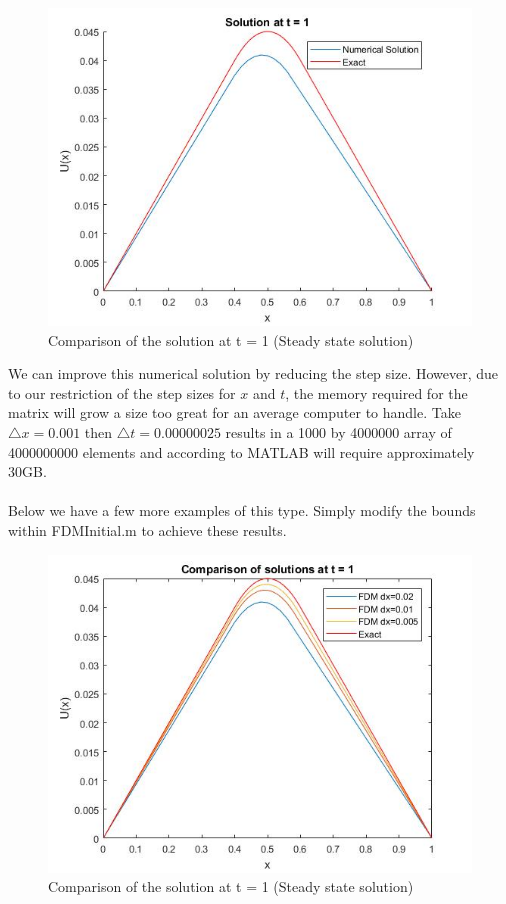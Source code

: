 \documentclass{article}
\begin{document}
\begin{figure}
	\begin{center}
		\includegraphics[width=\textwidth,height=\textheight,keepaspectratio]{MATLAB/D3.jpg}
	\end{center}
	\caption{Comparison of the solution at t = 1 (Steady state solution)}
\end{figure}
\newpage
We can improve this numerical solution by reducing the step size. However, due to our restriction of the step sizes for $x$ and $t$, the memory required for the matrix will grow a size too great for an average computer to handle. Take $\triangle x = 0.001$ then $\triangle t = 0.00000025$ results in a 1000 by 4000000 array of 4000000000 elements and according to MATLAB will require approximately 30GB.
\\
\\
Below we have a few more examples of this type. Simply modify the bounds within FDMInitial.m to achieve these results.
\begin{figure}
	\begin{center}
		\includegraphics[width=\textwidth,height=\textheight,keepaspectratio]{MATLAB/D4.jpg}
	\end{center}
	\caption{Comparison of the solution at t = 1 (Steady state solution)}
\end{figure}
\end{document}
